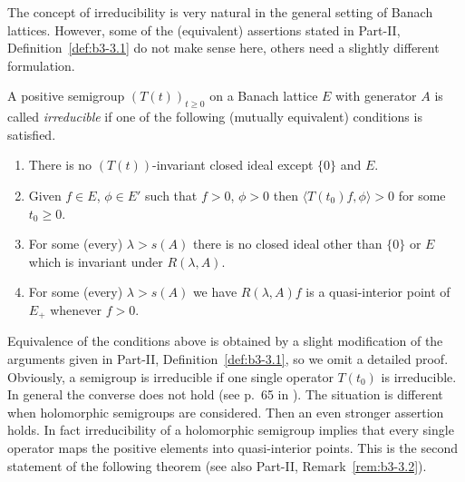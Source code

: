 The concept of irreducibility is very natural in the general setting of Banach lattices.
However, some of the (equivalent) assertions stated in Part-II, Definition~\ref{def:b3-3.1} do not make sense here, others need a slightly different formulation.
\begin{definition}\label{def:c3-3.1}
	
	A positive semigroup $(T(t))_{t\geq 0}$ on a Banach lattice $E$ with generator $A$ is called \emph{irreducible} if one of the following (mutually equivalent) conditions is satisfied.
	\begin{enumerate}[\upshape (a)]
	\item
	There is no $(T(t))$-invariant closed ideal except $\{0\}$ and $E$.
	
	\item 
	Given $f \in E$, $\phi \in E'$ such that $f > 0$, $\phi > 0$ then $\langle T(t_{0})f,\phi \rangle > 0$ for some $t_{0} \geq 0$.
	
    
	\item 
	For some (every) $\lambda > s(A)$ there is no closed ideal other than $\{0\}$ or $E$ which is invariant under $R(\lambda,A)$.
	
	\item 
	For some (every) $\lambda > s(A)$ we have $R(\lambda,A)f$ is a quasi-interior point of\/ $E_{+}$ whenever $f > 0$.
	\end{enumerate}
\end{definition}
Equivalence of the conditions above is obtained by a slight modification of the arguments given in Part-II, Definition~\ref{def:b3-3.1},
so we omit a detailed proof.
Obviously, a semigroup is irreducible if one single operator $T(t_{0})$ is irreducible.
In general the converse does not hold (see p.~65 in \textcite{greiner:1982}).
The situation is different when holomorphic semigroups are considered.
Then an even stronger assertion holds. In fact irreducibility of a holomorphic semigroup implies that every single operator maps the positive elements into quasi-interior points.
This is the second statement of the following theorem (see also Part-II, Remark~\ref{rem:b3-3.2}).

